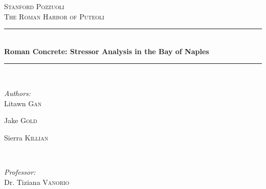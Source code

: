 \documentclass[12pt]{article}
\begin{document}
\begin{titlepage}

\newcommand{\HRule}{\rule{\linewidth}{0.5mm}} %

\center %
 

\textsc{\Large Stanford Pozzuoli}\\[0.5cm] %
\textsc{\large The Roman Harbor of Puteoli}\\[0.5cm] %


\HRule \\[0.4cm]
{ \huge \bfseries Roman Concrete: Stressor Analysis in the Bay of Naples}\\[0.4cm] %
\HRule \\[1.5cm]
 

\begin{minipage}{0.4\textwidth}
\begin{flushleft} \large
\emph{Authors:}\\
Litawn \textsc{Gan}

Jake \textsc{Gold} 

Sierra \textsc{Killian}
\end{flushleft}
\end{minipage}
~
\begin{minipage}{0.4\textwidth}
\begin{flushright} \large
\emph{Professor:} \\
Dr. Tiziana \textsc{Vanorio} 
\end{flushright}
\end{minipage}\\[.75cm]


\end{titlepage}
\end{document}

